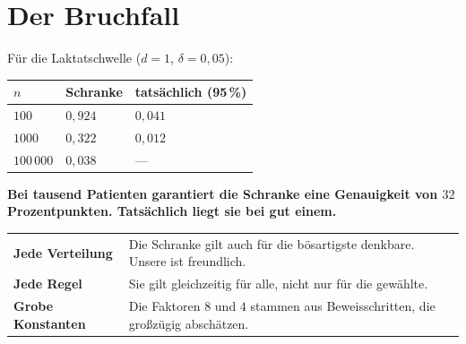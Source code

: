 \section{Der Bruchfall}

\begin{warnung}
Für die Laktatschwelle ($d = 1$, $\delta = 0{,}05$):

\begin{center}
{\small
\renewcommand{\arraystretch}{1.5}
\begin{tabular}{@{}P{1.8cm}P{2.4cm}P{2.8cm}@{}}
\toprule
$n$ & \textbf{Schranke} & \textbf{tatsächlich (95\,\%)}\\
\midrule
$100$ & $0{,}924$ & $0{,}041$\\
$1000$ & $0{,}322$ & $0{,}012$\\
$100\,000$ & $0{,}038$ & ---\\
\bottomrule
\end{tabular}}
\end{center}

\begin{center}
\begin{minipage}{0.9\textwidth}
\textbf{Bei tausend Patienten garantiert die Schranke eine Genauigkeit von $32$ Prozentpunkten. Tatsächlich liegt sie bei gut einem.}
\end{minipage}
\end{center}

\begin{center}
{\small
\renewcommand{\arraystretch}{1.5}
\begin{tabular}{@{}P{2.6cm}P{6.0cm}@{}}
\toprule
\textbf{Jede Verteilung} & Die Schranke gilt auch für die bösartigste denkbare. Unsere ist freundlich.\\
\textbf{Jede Regel} & Sie gilt gleichzeitig für alle, nicht nur für die gewählte.\\
\textbf{Grobe Konstanten} & Die Faktoren $8$ und $4$ stammen aus Beweisschritten, die großzügig abschätzen.\\
\bottomrule
\end{tabular}}
\end{center}

\begin{center}
\begin{minipage}{0.88\textwidth}
\end{minipage}
\end{center}


\end{warnung}
